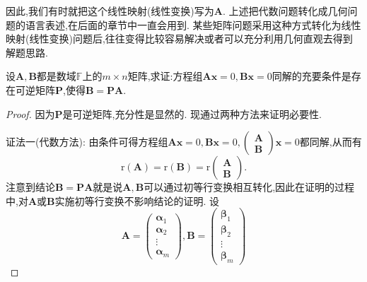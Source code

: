 \documentclass[../../main.tex]{subfiles}%
\begin{document}
因此,我们有时就把这个线性映射(线性变换)写为\(\boldsymbol{A}\). 上述把代数问题转化成几何问题的语言表述,在后面的章节中一直会用到. 某些矩阵问题采用这种方式转化为线性映射(线性变换)问题后,往往变得比较容易解决或者可以充分利用几何直观去得到解题思路.
\begin{example}
设\(\boldsymbol{A},\boldsymbol{B}\)都是数域\(\mathbb{F}\)上的\(m\times n\)矩阵,求证:方程组\(\boldsymbol{A}\boldsymbol{x}=0,\boldsymbol{B}\boldsymbol{x}=0\)同解的充要条件是存在可逆矩阵\(\boldsymbol{P}\),使得\(\boldsymbol{B}=\boldsymbol{P}\boldsymbol{A}\).
\end{example}
\begin{proof}

因为\(\boldsymbol{P}\)是可逆矩阵,充分性是显然的. 现通过两种方法来证明必要性.

{\color{blue}证法一(代数方法):} 由条件可得方程组\(\boldsymbol{A}\boldsymbol{x}=0,\boldsymbol{B}\boldsymbol{x}=0,\begin{pmatrix}\boldsymbol{A}\\\boldsymbol{B}\end{pmatrix}\boldsymbol{x}=0\)都同解,从而有
\[
\text{r}(\boldsymbol{A})=\text{r}(\boldsymbol{B})=\text{r}\begin{pmatrix}\boldsymbol{A}\\\boldsymbol{B}\end{pmatrix}.
\]
注意到结论\(\boldsymbol{B}=\boldsymbol{P}\boldsymbol{A}\)就是说\(\boldsymbol{A},\boldsymbol{B}\)可以通过初等行变换相互转化,因此在证明的过程中,对\(\boldsymbol{A}\)或\(\boldsymbol{B}\)实施初等行变换不影响结论的证明. 设
\[
\boldsymbol{A}=\begin{pmatrix}\boldsymbol{\alpha}_1\\\boldsymbol{\alpha}_2\\\vdots\\\boldsymbol{\alpha}_m\end{pmatrix},\boldsymbol{B}=\begin{pmatrix}\boldsymbol{\beta}_1\\\boldsymbol{\beta}_2\\\vdots\\\boldsymbol{\beta}_m\end{pmatrix}
\]

\end{proof}
\end{document}
